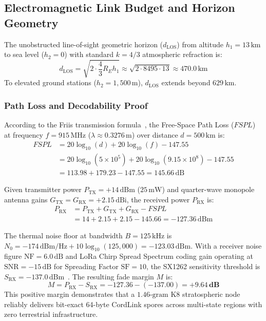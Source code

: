 \documentclass[10pt,twocolumn,letterpaper]{article}
\begin{document}
\subsection{Electromagnetic Link Budget and Horizon Geometry}

The unobstructed line-of-sight geometric horizon ($d_{\text{LOS}}$) from altitude $h_1 = 13\,\text{km}$ to sea level ($h_2 = 0$) with standard $k=4/3$ atmospheric refraction is:
\begin{equation}
d_{\text{LOS}} = \sqrt{2 \cdot \frac{4}{3} R_E h_1} \approx \sqrt{2 \cdot 8495 \cdot 13} \approx 470.0\,\text{km}
\end{equation}
To elevated ground stations ($h_2 = 1{,}500\,\text{m}$), $d_{\text{LOS}}$ extends beyond $629\,\text{km}$.

\subsubsection{Path Loss and Decodability Proof}
According to the Friis transmission formula~\cite{friis1946simple}, the Free-Space Path Loss ($FSPL$) at frequency $f = 915\,\text{MHz}$ ($\lambda \approx 0.3276\,\text{m}$) over distance $d = 500\,\text{km}$ is:
\begin{align}
FSPL &= 20\log_{10}(d) + 20\log_{10}(f) - 147.55 \nonumber \\
&= 20\log_{10}(5 \times 10^5) + 20\log_{10}(9.15 \times 10^8) - 147.55 \nonumber \\
&= 113.98 + 179.23 - 147.55 = 145.66\,\text{dB}
\end{align}

Given transmitter power $P_{\text{TX}} = +14\,\text{dBm}$ ($25\,\text{mW}$) and quarter-wave monopole antenna gains $G_{\text{TX}} = G_{\text{RX}} = +2.15\,\text{dBi}$, the received power $P_{\text{RX}}$ is:
\begin{align}
P_{\text{RX}} &= P_{\text{TX}} + G_{\text{TX}} + G_{\text{RX}} - FSPL \nonumber \\
&= 14 + 2.15 + 2.15 - 145.66 = -127.36\,\text{dBm}
\end{align}

The thermal noise floor at bandwidth $B = 125\,\text{kHz}$ is $N_0 = -174\,\text{dBm/Hz} + 10\log_{10}(125{,}000) = -123.03\,\text{dBm}$. With a receiver noise figure $\text{NF} = 6.0\,\text{dB}$ and LoRa Chirp Spread Spectrum coding gain operating at $\text{SNR} = -15\,\text{dB}$ for Spreading Factor $\text{SF} = 10$, the SX1262 sensitivity threshold is $S_{\text{RX}} = -137.0\,\text{dBm}$~\cite{semtech2020sx1262}. The resulting fade margin $M$ is:
\begin{equation}
M = P_{\text{RX}} - S_{\text{RX}} = -127.36 - (-137.00) = \mathbf{+9.64\,\text{dB}}
\end{equation}
This positive margin demonstrates that a $1.46\text{-gram}$ K8 stratospheric node reliably delivers bit-exact 64-byte CordLink spores across multi-state regions with zero terrestrial infrastructure.
\end{document}
